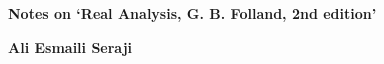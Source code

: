 \thispagestyle{empty}

\begin{vplace}[0.7]
\begin{center}
\bfseries \Large Notes on `Real Analysis, G. B. Folland, 2nd edition'

\vspace{1cm}

\bfseries \large Ali Esmaili Seraji
\end{center}
\end{vplace}
